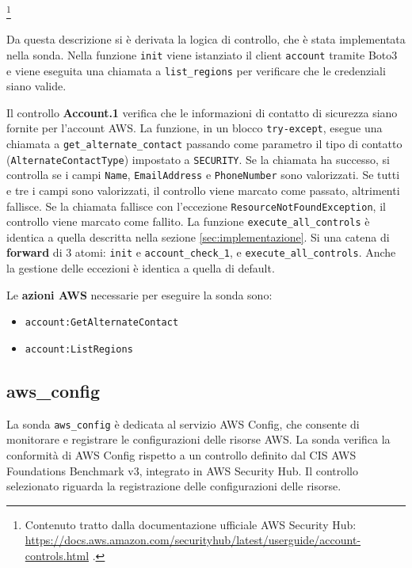 \footnote{Contenuto tratto dalla documentazione ufficiale AWS Security Hub: \url{https://docs.aws.amazon.com/securityhub/latest/userguide/account-controls.html} .}

Da questa descrizione si è derivata la logica di controllo, che è stata implementata nella sonda. Nella funzione \texttt{init} viene istanziato il client \texttt{account} tramite Boto3 e viene eseguita una chiamata a \texttt{list\_regions} per verificare che le credenziali siano valide.

Il controllo \textbf{Account.1} verifica che le informazioni di contatto di sicurezza siano fornite per l'account AWS. La funzione, in un blocco \texttt{try-except}, esegue una chiamata a \texttt{get\_alternate\_contact} passando come parametro il tipo di contatto (\texttt{AlternateContactType}) impostato a \texttt{SECURITY}. Se la chiamata ha successo, si controlla se i campi \texttt{Name}, \texttt{EmailAddress} e \texttt{PhoneNumber} sono valorizzati. Se tutti e tre i campi sono valorizzati, il controllo viene marcato come passato, altrimenti fallisce. Se la chiamata fallisce con l'eccezione \texttt{ResourceNotFoundException}, il controllo viene marcato come fallito.
La funzione \texttt{execute\_all\_controls} è identica a quella descritta nella sezione \ref{sec:implementazione}. Si una catena di \textbf{forward} di 3 atomi: \texttt{init} e \texttt{account\_check\_1}, e \texttt{execute\_all\_controls}. Anche la gestione delle eccezioni è identica a quella di default.

Le \textbf{azioni AWS} necessarie per eseguire la sonda sono:
\begin{itemize}
    \item \texttt{account:GetAlternateContact}
    \item \texttt{account:ListRegions}
\end{itemize}

\subsection{aws\_config}
\label{sec:config}

La sonda \texttt{aws\_config} è dedicata al servizio AWS Config, che consente di monitorare e registrare le configurazioni delle risorse AWS. La sonda verifica la conformità di AWS Config rispetto a un controllo definito dal CIS AWS Foundations Benchmark v3, integrato in AWS Security Hub. Il controllo selezionato riguarda la registrazione delle configurazioni delle risorse.

